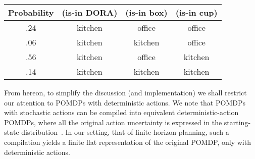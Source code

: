 \small
\begin{tabular}{cccc}
\hline
Probability & (is-in DORA)  & (is-in box)  & (is-in cup) \\
\hline
.24 & kitchen & office & office \\
.06 & kitchen & kitchen & office \\
.56 & kitchen & office & kitchen \\
.14 & kitchen & kitchen & kitchen \\
\hline
\end{tabular}
\normalsize

From hereon, to simplify the discussion (and implementation)
we shall restrict our attention to POMDPs with deterministic
actions. We note that POMDPs with stochastic
actions can be compiled into equivalent deterministic-action POMDPs,
where all the original action uncertainty is expressed in the
starting-state distribution~\cite{ng:Jordan:2000}. In our setting,
that of finite-horizon planning, such a compilation yields a finite
flat representation of the original POMDP, only with deterministic
actions.
